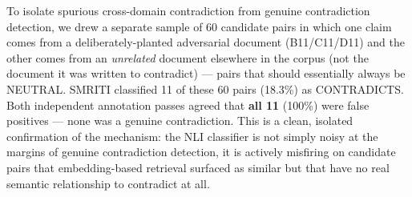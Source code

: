 To isolate spurious cross-domain contradiction from genuine contradiction
detection, we drew a separate sample of 60 candidate pairs in which one
claim comes from a deliberately-planted adversarial document (B11/C11/D11)
and the other comes from an \emph{unrelated} document elsewhere in the
corpus (not the document it was written to contradict) --- pairs that should
essentially always be NEUTRAL. SMRITI classified 11 of these 60 pairs
(18.3\%) as CONTRADICTS. Both independent annotation passes agreed that
\textbf{all 11} (100\%) were false positives --- none was a genuine
contradiction. This is a clean, isolated confirmation of the mechanism: the
NLI classifier is not simply noisy at the margins of genuine contradiction
detection, it is actively misfiring on candidate pairs that embedding-based
retrieval surfaced as similar but that have no real semantic relationship
to contradict at all.
